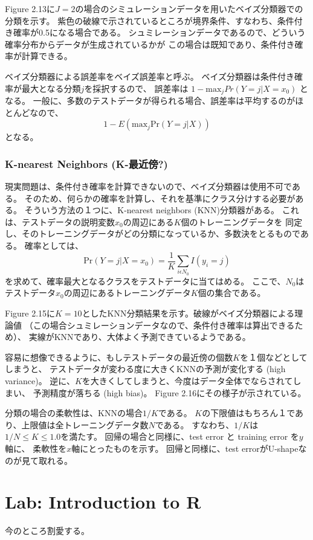 \documentclass{jsbook}
\begin{document}
Figure 2.13に$J=2$の場合のシミュレーションデータを用いたベイズ分類器での分類を示す。
紫色の破線で示されているところが境界条件、すなわち、条件付き確率が0.5になる場合である。
シュミレーションデータであるので、どういう確率分布からデータが生成されているかが
この場合は既知であり、条件付き確率が計算できる。

ベイズ分類器による誤差率をベイズ誤差率と呼ぶ。
ベイズ分類器は条件付き確率が最大となる分類$j$を採択するので、
誤差率は $1- \text{max}_j Pr(Y=j | X = x_0)$ となる。
一般に、多数のテストデータが得られる場合、誤差率は平均するのがほとんどなので、
\begin{equation}
	1 - E ( \text{max}_j \text{Pr}(Y = j | X))
\end{equation}
となる。

\subsubsection{K-nearest Neighbors (K-最近傍?)}
現実問題は、条件付き確率を計算できないので、ベイズ分類器は使用不可である。
そのため、何らかの確率を計算し、それを基準にクラス分けする必要がある。
そういう方法の１つに、K-nearest neighbors (KNN)分類器がある。
これは、テストデータの説明変数$x_0$の周辺にある$K$個のトレーニングデータを
同定し、そのトレーニングデータがどの分類になっているか、多数決をとるものである。
確率としては、
\begin{equation}
	\text{Pr}(Y = j | X = x_0) = \frac{1}{K} \sum_{i \epsilon N_0} I(y_i = j)
\end{equation}
を求めて、確率最大となるクラスをテストデータに当てはめる。
ここで、$N_0$はテストデータ$x_0$の周辺にあるトレーニングデータ$K$個の集合である。

Figure 2.15に$K=10$としたKNN分類結果を示す。破線がベイズ分類器による理論値
（この場合シュミレーションデータなので、条件付き確率は算出できるため）、
実線がKNNであり、大体よく予測できているようである。

容易に想像できるように、もしテストデータの最近傍の個数$K$を１個などとしてしまうと、
テストデータが変わる度に大きくKNNの予測が変化する (high variance)。
逆に、$K$を大きくしてしまうと、今度はデータ全体でならされてしまい、
予測精度が落ちる (high bias)。
Figure 2.16にその様子が示されている。

分類の場合の柔軟性は、KNNの場合$1/K$である。
$K$の下限値はもちろん１であり、上限値は全トレーニングデータ数$N$である。
すなわち、$1/K$は$1/N \le K \le 1.0$を満たす。
回帰の場合と同様に、test error と training error を$y$軸に、
柔軟性を$x$軸にとったものを示す。
回帰と同様に、test errorがU-shapeなのが見て取れる。

\section{Lab: Introduction to R}
今のところ割愛する。
\end{document}
